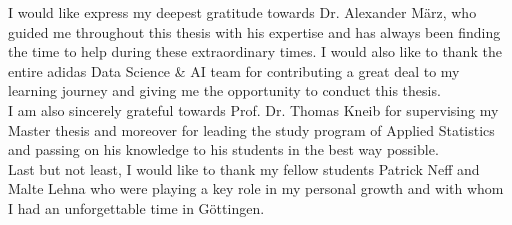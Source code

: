 



I would like express my deepest gratitude towards Dr. Alexander März, who guided me throughout this thesis with his expertise and has always been finding the time to help during these extraordinary times. I would also like to thank the entire adidas Data Science \& AI team for contributing a great deal to my learning journey and giving me the opportunity to conduct this thesis.\\
I am also sincerely grateful towards Prof. Dr. Thomas Kneib for supervising my Master thesis and moreover for leading the study program of Applied Statistics and passing on his knowledge to his students in the best way possible.\\
Last but not least, I would like to thank my fellow students Patrick Neff and Malte Lehna who were playing a key role in my personal growth and with whom I had an unforgettable time in Göttingen. 

\vspace{1cm}


\textbf{}


